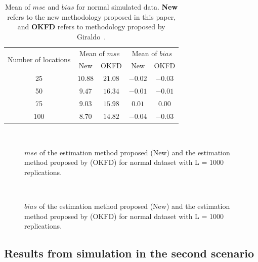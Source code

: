 \documentclass[12pt]{interact}
\theoremstyle{plain}%
\theoremstyle{definition}
\theoremstyle{remark}
\begin{document}
\begin{table}[p]
	\centering
	\caption{Mean of $mse$ and $bias$ for normal simulated data. \textbf{New} refers to the new methodology proposed in this paper, and \textbf{OKFD} refers to methodology proposed by Giraldo~\cite{giraldo2011ordinary}.}
	\label{tab:summary-normal}
	\begin{tabular}{ccc|cc}
		\toprule
		\multirow{2}{*}{Number of locations}& \multicolumn{2}{c|}{Mean of $mse$} & \multicolumn{2}{|c}{Mean of $bias$}\\ \cmidrule{2-5}
		& New & OKFD & New & OKFD \\ \midrule
		25 & $10.88$ & $21.08$ & $-0.02$ & $-0.03$\\
		50 & $9.47$ & $16.34$ & $-0.01$ & $-0.01$\\
		75 & $9.03$ & $15.98$ & $0.01$ & $0.00$\\
		100 & $8.70$ & $14.82$ & $-0.04$ & $-0.03$\\ \bottomrule
	\end{tabular}
\end{table}

\begin{figure}[p]
	 \\
	\caption{$mse$ of the estimation method proposed (New) and the estimation method proposed by \citet{giraldo2011ordinary} (OKFD) for normal dataset with L = 1000 replications.}
\end{figure}

\begin{figure}[p]
	 \\
	\caption{$bias$ of the estimation method proposed (New) and the estimation method proposed by \citet{giraldo2011ordinary} (OKFD) for normal dataset with L = 1000 replications.}
\end{figure}

\subsection*{Results from simulation in the second scenario}\label{results-from-simulation-in-the-second-scenario}
\end{document}
